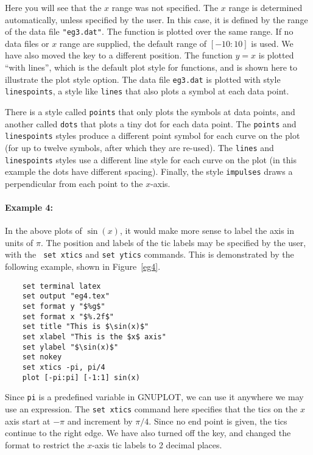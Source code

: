 Here you will see that the $x$ range was not specified. The $x$ range
is determined automatically, unless specified by the user.  In
this case, it is defined by the range of the data file
\verb+"eg3.dat"+. The function is plotted over the same range. If no
data files or $x$ range are supplied, the default range of $[-10:10]$
is used. We have also moved the key to a different position.  The
function $y=x$ is plotted ``with lines'', which is the default plot
style for functions, and is shown here to illustrate the plot style
option.  The data file {\tt eg3.dat} is plotted with style {\tt
linespoints}, a style like {\tt lines} that also plots a symbol at
each data point.

There is a style called {\tt points} that only plots the symbols at
data points, and another called {\tt dots} that plots a tiny dot for
each data point.  The {\tt points} and {\tt linespoints} styles
produce a different point symbol for each curve on the plot (for up to
twelve symbols, after which they are re-used). The {\tt lines} and
{\tt linespoints} styles use a different line style for each curve on
the plot (in this example the dots have different spacing). Finally,
the style {\tt impulses} draws a perpendicular from each point to the
$x$-axis.

\paragraph{Example 4:} In the above plots of $\sin(x)$, it would make
more sense to label the axis in units of $\pi$. The position and
labels of the tic labels may be specified by the user, with the {\tt
set xtics} and {\tt set ytics} commands. This is demonstrated by
the following example, shown in Figure~\ref{eg4}.

\singlespace
\begin{verbatim}
    set terminal latex
    set output "eg4.tex"
    set format y "$%g$"
    set format x "$%.2f$"
    set title "This is $\sin(x)$"
    set xlabel "This is the $x$ axis"
    set ylabel "$\sin(x)$"
    set nokey
    set xtics -pi, pi/4
    plot [-pi:pi] [-1:1] sin(x)
\end{verbatim}
\currentspace


Since {\tt pi} is a predefined variable in GNUPLOT, we can use it
anywhere we may use an expression. The {\tt set xtics} command here
specifies that the tics on the $x$ axis start at $-\pi$ and increment
by $\pi/4$. Since no end point is given, the tics continue to the
right edge. We have also turned off the key, and changed the format to
restrict the $x$-axis tic labels to 2 decimal places.

